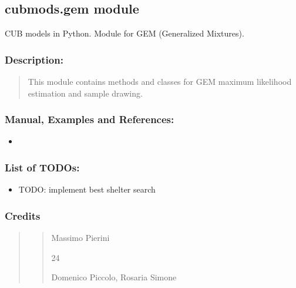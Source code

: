 \documentclass[letterpaper,10pt,english]{sphinxmanual}
\begin{document}
\subsection{cubmods.gem module}
\label{\detokenize{cubmods:module-cubmods.gem}}\label{\detokenize{cubmods:cubmods-gem-module}}\label{\detokenize{cubmods:gem-module}}
\sphinxAtStartPar
CUB models in Python.
Module for GEM (Generalized Mixtures).


\subsubsection{Description:}
\label{\detokenize{cubmods:id68}}\begin{quote}

\sphinxAtStartPar
This module contains methods and classes
for GEM maximum likelihood estimation
and sample drawing.
\end{quote}


\subsubsection{Manual, Examples and References:}
\label{\detokenize{cubmods:id69}}\begin{itemize}
\item {} 
\sphinxAtStartPar
{}

\end{itemize}


\subsubsection{List of TODOs:}
\label{\detokenize{cubmods:id70}}\begin{itemize}
\item {} 
\sphinxAtStartPar
TODO: implement best shelter search

\end{itemize}


\subsubsection{Credits}
\label{\detokenize{cubmods:id71}}\begin{quote}
\begin{quote}\begin{description}
\sphinxAtStartPar
Massimo Pierini

\sphinxhyphen{}24

\sphinxAtStartPar
Domenico Piccolo, Rosaria Simone

\sphinxAtStartPar
{}

\end{description}\end{quote}
\end{quote}
\end{document}
